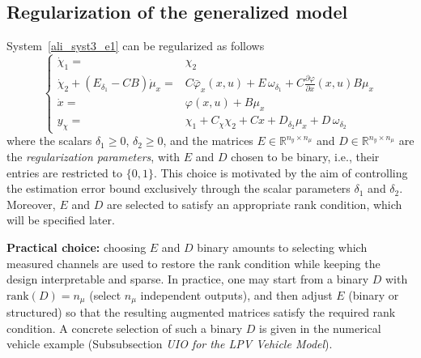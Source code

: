 \subsection{Regularization of the generalized model}
System~\eqref{ali_syst3_e1} can be regularized as follows
\begin{equation}\label{ali_syst3_e2}
\left\{
\begin{array}{rcl}
\dot{\chi}_{1}  = & \chi_{2} 
\\
\dot{\chi}_{2} + \left( E_{\delta_{1}} - C B \right) \dot{\mu}_{x}   = & C  \bar{\varphi}_{x}(x,u)  + E\, \omega_{\delta_{1}} +\displaystyle C \frac{\partial \varphi}{\partial x}(x,u) B \mu_{x}
\\ 
\dot{x}  = &  \varphi(x,u) + B \mu_{x} \\
y_{\chi}  = &  \chi_{1} + C_{\chi} \chi_{2} + C x  +D_{\delta_2} \mu_{x} + D\, \omega_{\delta_{2}} 
\end{array}
\right.
\end{equation}
where the scalars $\delta_1 \geq 0$, $\delta_2 \geq 0$, and the matrices $E\in\mathbb{R}^{n_{y}\times n_{\mu}}$ and $D\in\mathbb{R}^{n_{y}\times n_{\mu}}$ are the {\it regularization parameters}, with $E$ and $D$ chosen to be binary, i.e., their entries are restricted to $\{0,1\}$. This choice is motivated by the aim of controlling the estimation error bound exclusively through the scalar parameters $\delta_1$ and $\delta_2$. Moreover, $E$ and $D$ are selected to satisfy an appropriate rank condition, which will be specified later.

\noindent\textbf{Practical choice:} choosing $E$ and $D$ binary amounts to selecting which measured channels are used to restore the rank condition while keeping the design interpretable and sparse. In practice, one may start from a binary $D$ with $\mathrm{rank}(D)=n_{\mu}$ (select $n_{\mu}$ independent outputs), and then adjust $E$ (binary or structured) so that the resulting augmented matrices satisfy the required rank condition. A concrete selection of such a binary $D$ is given in the numerical vehicle example (Subsubsection \emph{UIO for the LPV Vehicle Model}).


